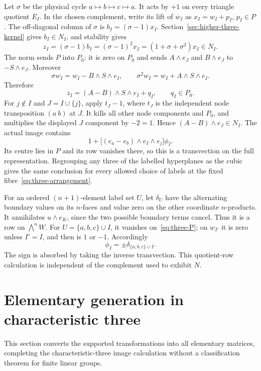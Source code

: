 Let $\sigma$ be the physical cycle $a\mapsto b\mapsto c\mapsto a$. It acts by $+1$ on every triangle quotient $E_I$. In the chosen complement, write its lift of $\overline w_I$ as $x_I=w_I+p_I$, $p_I\in P$. The off-diagonal column of $\sigma$ is $b_I=(\sigma-1)x_I$. Section~\ref{sec:higher-three-kernel} gives $b_I\in N_I$, and stability gives
\[
z_I=(\sigma-1)b_I=(\sigma-1)^2x_I=(1+\sigma+\sigma^2)x_I\in N_I.
\]
The norm sends $P$ into $P_0$: it is zero on $P_0$ and sends $A\wedge e_J$ and $B\wedge e_J$ to $-S\wedge e_J$. Moreover
\[
\sigma w_I=w_I-B\wedge S\wedge e_I,
\qquad \sigma^2w_I=w_I+A\wedge S\wedge e_I.
\]
Therefore
\begin{equation}\label{eq:three-norm}
z_I=(A-B)\wedge S\wedge e_I+q_I,
\qquad q_I\in P_0.
\end{equation}
For $j\notin I$ and $J=I\cup\{j\}$, apply $t_J-1$, where $t_J$ is the independent node transposition $(a\ b)$ at $J$. It kills all other node components and $P_0$, and multiplies the displayed $J$ component by $-2=1$. Hence $(A-B)\wedge e_J\in N_I$. The actual image contains
\begin{equation}\label{eq:three-supported}
1+\bigl[(e_a-e_b)\wedge e_I\wedge e_j\bigr]\phi_I.
\end{equation}
Its centre lies in $P$ and its row vanishes there, so this is a transvection on the full representation. Regrouping any three of the labelled hyperplanes as the cubic gives the same conclusion for every allowed choice of labels at the fixed fibre~\eqref{eq:three-arrangement}.

For an ordered $(n+1)$-element label set $U$, let $\delta_U$ have the alternating boundary values on its $n$-faces and value zero on the other coordinate $n$-products. It annihilates $u\wedge e_K$, since the two possible boundary terms cancel. Thus it is a row on $\bigwedge^nW$. For $U=\{a,b,c\}\cup I$, it vanishes on~\eqref{eq:three-P}; on $w_{I'}$ it is zero unless $I'=I$, and then is $1$ or $-1$. Accordingly
\begin{equation}\label{eq:three-row}
\phi_I=\pm\delta_{\{a,b,c\}\cup I}.
\end{equation}
The sign is absorbed by taking the inverse transvection. This quotient-row calculation is independent of the complement used to exhibit $N$.

\section{Elementary generation in characteristic three}\label{sec:higher-three-group}
This section converts the supported transformations into all elementary matrices, completing the characteristic-three image calculation without a classification theorem for finite linear groups.

